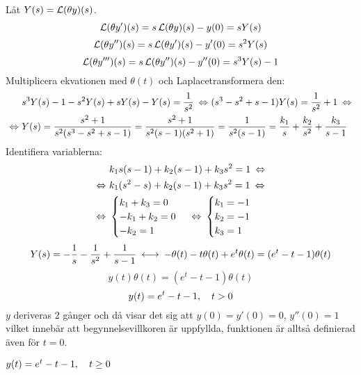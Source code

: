 \begin{task}{5.9}
	Låt $Y(s)=\operatorname{\mathcal{L}}(\theta y)(s)$.
	\[\operatorname{\mathcal{L}}(\theta y')(s)=s\operatorname{\mathcal{L}}(\theta y)(s)-y(0)=sY(s)\]
	\[\operatorname{\mathcal{L}}(\theta y'')(s)=s\operatorname{\mathcal{L}}(\theta y')(s)-y'(0)=s^2Y(s)\]
	\[\operatorname{\mathcal{L}}(\theta y''')(s)=s\operatorname{\mathcal{L}}(\theta y'')(s)-y''(0)=s^3Y(s)-1\]
	Multiplicera ekvationen med $\theta(t)$ och Laplacetransformera den:
	\begin{align*}
	&s^3Y(s)-1-s^2Y(s)+sY(s)-Y(s)=\frac{1}{s^2} \lra
	(s^3-s^2+s-1)Y(s)=\frac{1}{s^2}+1 \lra \\ \lra
	&Y(s)=\frac{s^2+1}{s^2(s^3-s^2+s-1)}=
	\frac{s^2+1}{s^2(s-1)(s^2+1)}=
	\frac{1}{s^2(s-1)}=
	\frac{k_1}{s}+\frac{k_2}{s^2}+\frac{k_3}{s-1}
	\end{align*}
	Identifiera variablerna:
	\begin{align*}
	&k_1s(s-1)+k_2(s-1)+k_3s^2=1 \lra \\ \lra
	&k_1(s^2-s)+k_2(s-1)+k_3s^2=1 \lra \\ \lra
	&\begin{cases}
	k_1+k_3=0 \\
	-k_1+k_2=0 \\
	-k_2=1
	\end{cases} \lra
	\begin{cases}
	k_1=-1 \\
	k_2=-1 \\
	k_3=1
	\end{cases}
	\end{align*}
	\begin{align*}
	Y(s)=-\frac{1}{s}-\frac{1}{s^2}+\frac{1}{s-1} \llra
	-\theta(t)-t\theta(t)+e^{t}\theta(t)=
	(e^{t}-t-1)\theta(t)
	\end{align*}
	\[y(t)\theta(t)=(e^{t}-t-1)\theta(t)\]
	\[y(t)=e^{t}-t-1, \quad t>0\]
	$y$ deriveras 2 gånger och då visar det sig att $y(0)=y'(0)=0$, $y''(0)=1$ vilket innebär att begynnelsevillkoren är uppfyllda, funktionen är alltså definierad även för $t=0$.
	
	\ans $y(t)=e^{t}-t-1, \quad t\ge0$
\end{task}
